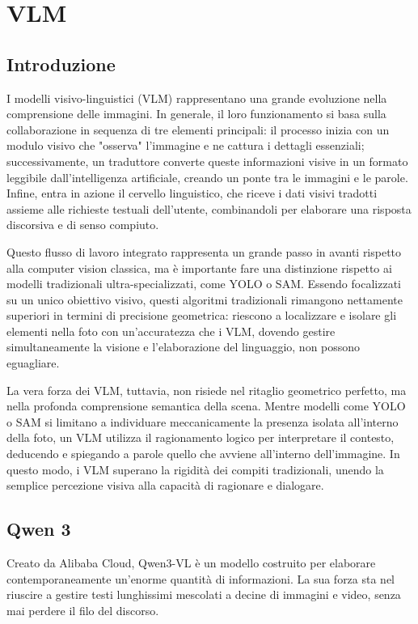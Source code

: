 \chapter{VLM}
\section{Introduzione}

I modelli visivo-linguistici (VLM) rappresentano una grande evoluzione nella comprensione delle immagini.
In generale, il loro funzionamento si basa sulla collaborazione in sequenza di tre elementi principali: il processo inizia con un modulo visivo che "osserva" l'immagine e ne cattura i dettagli essenziali; successivamente,
un traduttore converte queste informazioni visive in un formato leggibile dall'intelligenza artificiale, creando un ponte tra le immagini e le parole.
Infine, entra in azione il cervello linguistico, che riceve i dati visivi tradotti assieme alle richieste testuali dell'utente, combinandoli per elaborare una risposta discorsiva e di senso compiuto.

Questo flusso di lavoro integrato rappresenta un grande passo in avanti rispetto alla computer vision classica, ma è importante fare una distinzione rispetto ai modelli tradizionali ultra-specializzati, come YOLO o SAM.
Essendo focalizzati su un unico obiettivo visivo, questi algoritmi tradizionali rimangono nettamente superiori in termini di precisione geometrica: riescono a localizzare e isolare gli elementi nella foto con un'accuratezza che i VLM,
dovendo gestire simultaneamente la visione e l'elaborazione del linguaggio, non possono eguagliare.

La vera forza dei VLM, tuttavia, non risiede nel ritaglio geometrico perfetto, ma nella profonda comprensione semantica della scena. Mentre modelli come YOLO o SAM si limitano a individuare meccanicamente
la presenza isolata all'interno della foto, un VLM utilizza il ragionamento logico per interpretare il contesto, deducendo e spiegando a parole quello che avviene all'interno dell'immagine.
In questo modo, i VLM superano la rigidità dei compiti tradizionali, unendo la semplice percezione visiva alla capacità di ragionare e dialogare.

\newpage

\section{Qwen 3}

Creato da Alibaba Cloud, Qwen3-VL è un modello costruito per elaborare contemporaneamente un'enorme quantità di informazioni.
La sua forza sta nel riuscire a gestire testi lunghissimi mescolati a decine di immagini e video, senza mai perdere il filo del discorso. \cite{qwen3_github}

